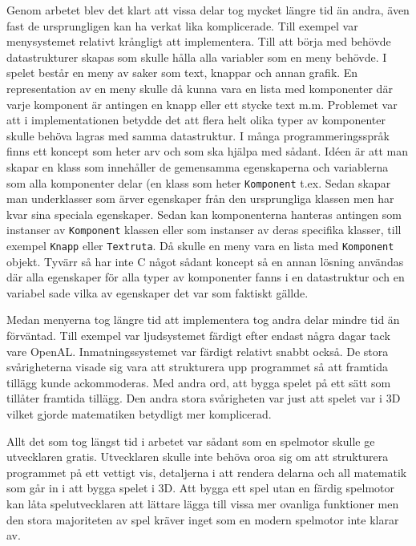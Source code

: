 \documentclass[12pt, a4paper]{article}
\newcommand{\code}{\texttt}
\begin{document}
	Genom arbetet blev det klart att vissa delar tog mycket längre tid än andra, även fast de ursprungligen kan ha verkat lika komplicerade. Till exempel var menysystemet relativt krångligt att implementera. Till att börja med behövde datastrukturer skapas som skulle hålla alla variabler som en meny behövde. I spelet består en meny av saker som text, knappar och annan grafik. En representation av en meny skulle då kunna vara en lista med komponenter där varje komponent är antingen en knapp eller ett stycke text m.m. Problemet var att i implementationen betydde det att flera helt olika typer av komponenter skulle behöva lagras med samma datastruktur. I många programmeringsspråk finns ett koncept som heter arv och som ska hjälpa med sådant. Idéen är att man skapar en klass som innehåller de gemensamma egenskaperna och variablerna som alla komponenter delar (en klass som heter \code{Komponent} t.ex. Sedan skapar man underklasser som ärver egenskaper från den ursprungliga klassen men har kvar sina speciala egenskaper. Sedan kan komponenterna hanteras antingen som instanser av \code{Komponent} klassen eller som instanser av deras specifika klasser, till exempel \code{Knapp} eller \code{Textruta}. Då skulle en meny vara en lista med \code{Komponent} objekt. Tyvärr så har inte C något sådant koncept så en annan lösning användas där alla egenskaper för alla typer av komponenter fanns i en datastruktur och en variabel sade vilka av egenskaper det var som faktiskt gällde. 
	
	Medan menyerna tog längre tid att implementera tog andra delar mindre tid än förväntad. Till exempel var ljudsystemet färdigt efter endast några dagar tack vare OpenAL. Inmatningssystemet var färdigt relativt snabbt också. De stora svårigheterna visade sig vara att strukturera upp programmet så att framtida tillägg kunde ackommoderas. Med andra ord, att bygga spelet på ett sätt som tillåter framtida tillägg. Den andra stora svårigheten var just att spelet var i 3D vilket gjorde matematiken betydligt mer komplicerad. 
	
	Allt det som tog längst tid i arbetet var sådant som en spelmotor skulle ge utvecklaren gratis. Utvecklaren skulle inte behöva oroa sig om att strukturera programmet på ett vettigt vis, detaljerna i att rendera delarna och all matematik som går in i att bygga spelet i 3D. Att bygga ett spel utan en färdig spelmotor kan låta spelutvecklaren att lättare lägga till vissa mer ovanliga funktioner men den stora majoriteten av spel kräver inget som en modern spelmotor inte klarar av. 
	
\end{document}
